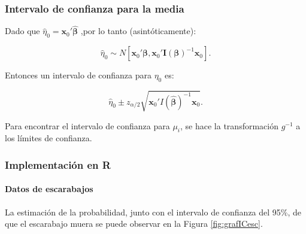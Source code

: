 \documentclass[
]{article}
\begin{document}
\subsubsection{Intervalo de confianza para la media}\label{intervalo-de-confianza-para-la-media}

Dado que \(\widehat{\eta}_0=\boldsymbol x_0'\widehat{\boldsymbol \beta}\) ,por lo tanto (asintóticamente):

\[
\widehat{\eta}_0\sim N[\boldsymbol x_0'\boldsymbol \beta,\boldsymbol x_0'\boldsymbol I(\boldsymbol \beta)^{-1}\boldsymbol x_0].
\]

Entonces un intervalo de confianza para \(\eta_0\) es:

\[
\widehat{\eta}_0\pm z_{\alpha/2}\sqrt{\boldsymbol x_0'I(\widehat{\boldsymbol \beta})^{-1}\boldsymbol x_0}.
\]

Para encontrar el intervalo de confianza para \(\mu_i\), se hace la transformación \(g^{-1}\) a los límites de confianza.

\subsubsection{Implementación en R}\label{implementaciuxf3n-en-r-7}

\paragraph{Datos de escarabajos}\label{datos-de-escarabajos-2}

La estimación de la probabilidad, junto con el intervalo de confianza del 95\%, de que el escarabajo muera se puede observar en la Figura \ref{fig:grafICesc}.
\end{document}
